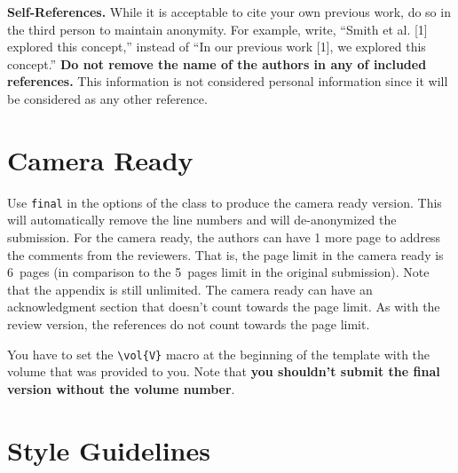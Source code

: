\documentclass[fullpaper]{nldl}
\begin{document}
\textbf{Self-References.}
While it is acceptable to cite your own previous work, do so in the third person to maintain anonymity.
For example, write, ``Smith et al. [1] explored this concept,'' instead of ``In our previous work [1], we explored this concept.''
\textbf{Do not remove the name of the authors in any of included references.}
This information is not considered personal information since it will be considered as any other reference.

\section{Camera Ready}

Use \verb|final| in the options of the class to produce the camera ready version.
This will automatically remove the line numbers and will de-anonymized the submission.
For the camera ready, the authors can have 1 more page to address the comments from the reviewers.
That is, the page limit in the camera ready is 6~pages (in comparison to the 5~pages limit in the original submission).
Note that the appendix is still unlimited.
The camera ready can have an acknowledgment section that doesn't count towards the page limit.
As with the review version, the references do not count towards the page limit.

You have to set the \verb|\vol{V}| macro at the beginning of the template with the volume that was provided to you.
Note that \textbf{you shouldn't submit the final version without the volume number}.

\section{Style Guidelines}
\end{document}
